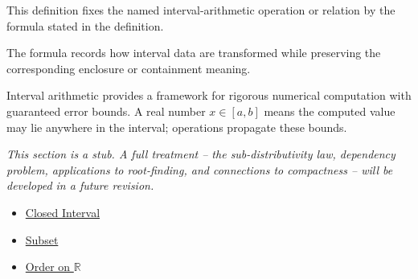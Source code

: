 \begin{remark*}
This definition fixes the named interval-arithmetic operation or relation by
the formula stated in the definition.
\end{remark*}

\begin{remark*}[Interpretation]
The formula records how interval data are transformed while preserving the
corresponding enclosure or containment meaning.
\end{remark*}

\begin{remark*}[Exposition]
Interval arithmetic provides a framework for rigorous numerical computation
with guaranteed error bounds. A real number $x \in [a,b]$ means the computed
value may lie anywhere in the interval; operations propagate these bounds.
\end{remark*}

\begin{remark*}[Exposition]
\textit{This section is a stub. A full treatment -- the sub-distributivity law,
dependency problem, applications to root-finding, and connections to
compactness -- will be developed in a future revision.}
\end{remark*}

\begin{dependencies}
\begin{itemize}
  \item \hyperref[def:closed-interval]{Closed Interval}
  \item \hyperref[def:subset]{Subset}
  \item \hyperref[def:order-on-r]{Order on $\mathbb{R}$}
\end{itemize}
\end{dependencies}

